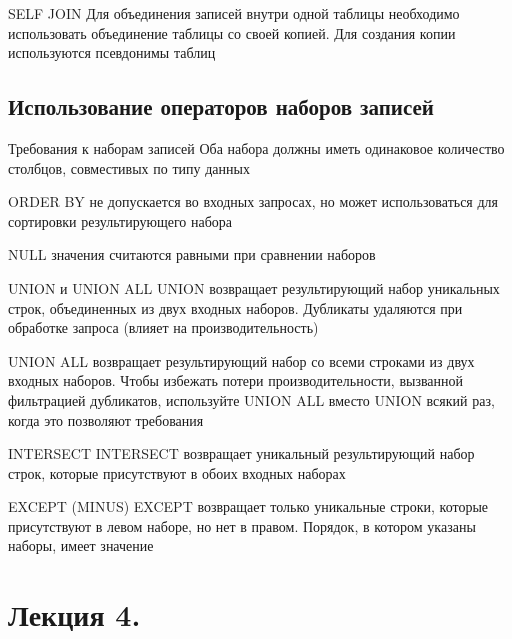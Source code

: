 \documentclass[12pt]{article}
\begin{document}
\begin{defin}{SELF JOIN}
    Для объединения записей внутри одной таблицы необходимо использовать объединение таблицы со своей копией. Для создания копии используются псевдонимы таблиц
\end{defin}

\newpage 

\subsection{Использование операторов наборов записей}

\begin{nota}{Требования к наборам записей}
    Оба набора должны иметь одинаковое количество столбцов, совместивых по типу данных 

    ORDER BY не допускается во входных запросах, но может использоваться для сортировки результирующего набора 

    NULL значения считаются равными при сравнении наборов
\end{nota}

\begin{defin}{UNION и UNION ALL}
    UNION возвращает результирующий набор уникальных строк, объединенных из двух входных наборов. Дубликаты удаляются при обработке запроса (влияет на производительность) 

    UNION ALL возвращает результирующий набор со всеми строками из двух входных наборов. Чтобы избежать потери производительности, вызванной фильтрацией дубликатов, используйте UNION ALL вместо UNION всякий раз, когда это позволяют требования
\end{defin}

\begin{defin}{INTERSECT}
    INTERSECT возвращает уникальный результирующий набор строк, которые присутствуют в обоих входных наборах
\end{defin}

\begin{defin}{EXCEPT (MINUS)}
    EXCEPT возвращает только уникальные строки, которые присутствуют в левом наборе, но нет в правом. Порядок, в котором указаны наборы, имеет значение
\end{defin}

\newpage 

\section{Лекция 4.}
\end{document}
